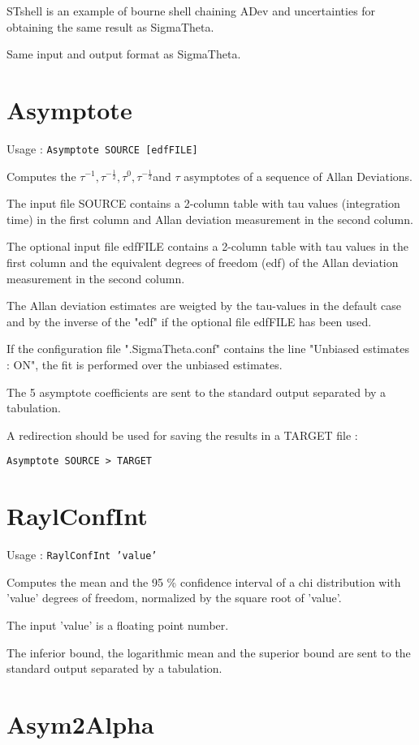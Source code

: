 \documentclass[12pt,a4paper,french]{article}
\begin{document}
STshell is an example of bourne shell chaining ADev and uncertainties for obtaining the same result as SigmaTheta.

Same input and output format as SigmaTheta.

\section{Asymptote}

Usage : {\tt{Asymptote SOURCE [edfFILE]}}

Computes the $\tau^{-1}, \tau^{-\frac{1}{2}}, \tau^0 , \tau^{-\frac{1}{2}} $and $\tau$ asymptotes of a sequence of Allan Deviations.

The input file SOURCE contains a 2-column table with tau values (integration time) in the first column and Allan deviation measurement in the second column.

The optional input file edfFILE contains a 2-column table with tau values in the first column and the equivalent degrees of freedom (edf) of the Allan deviation measurement in the second column.

The Allan deviation estimates are weigted by the tau-values in the default case and by the inverse of the "edf" if the optional file edfFILE has been used.

If the configuration file ".SigmaTheta.conf" contains the line "Unbiased estimates : ON", the fit is performed over the unbiased estimates.

The 5 asymptote coefficients are sent to the standard output separated by a tabulation.

A redirection should be used for saving the results in a TARGET file : 

{\tt{Asymptote SOURCE > TARGET}}

\section{RaylConfInt}

Usage : {\tt{RaylConfInt ’value’}}

Computes the mean and the 95 \% confidence interval of a chi distribution with ’value’ degrees of freedom, normalized by the square root of ’value’.

The input ’value’ is a floating point number.

The inferior bound, the logarithmic mean and the superior bound are sent to the standard output separated by a tabulation.

\section{Asym2Alpha}
\end{document}
